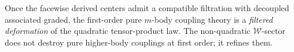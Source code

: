\begin{remark}
\label{rem:w-filtered-stability-meaning}
Once the facewise derived centers admit a compatible filtration with decoupled associated
graded, the first-order pure $m$-body coupling theory is a \emph{filtered deformation} of the quadratic tensor-product law.
The non-quadratic $\mathcal W$-sector does not destroy pure higher-body couplings at first order; it refines them.
\end{remark}
